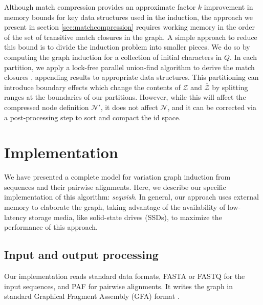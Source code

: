 \documentclass{bioinfo}
\theoremstyle{definition}
\begin{document}
Although match compression provides an approximate factor $k$ improvement in memory bounds for key data structures used in the induction, the approach we present in section \ref{sec:matchcompression} requires working memory in the order of the set of transitive match closures in the graph.
A simple approach to reduce this bound is to divide the induction problem into smaller pieces.
We do so by computing the graph induction for a collection of initial characters in $Q$.
In each partition, we apply a lock-free parallel union-find algorithm to derive the match closures \citep{anderson1991wait}, appending results to appropriate data structures.
This partitioning can introduce boundary effects which change the contents of $\mathcal{Z}$ and $\bar{\mathcal{Z}}$ by splitting ranges at the boundaries of our partitions.
However, while this will affect the compressed node definition $\mathcal{N}'$, it does not affect $\mathcal{N}$, and it can be corrected via a post-processing step to sort and compact the id space.


\section{Implementation}

We have presented a complete model for variation graph induction from sequences and their pairwise alignments.
Here, we describe our specific implementation of this algorithm: \textit{seqwish}.
In general, our approach uses external memory to elaborate the graph, taking advantage of the availability of low-latency storage media, like solid-state drives (SSDs), to maximize the performance of this approach.

\subsection{Input and output processing}

Our implementation reads standard data formats, FASTA or FASTQ for the input sequences, and PAF \citep{Li_2018} for pairwise alignments.
It writes the graph in standard Graphical Fragment Assembly (GFA) format \citep{GFA}.
\end{document}
